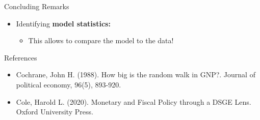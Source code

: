 \documentclass[10pt,c,aspectratio=1610,handout]{beamer}
\begin{document}
\begin{frame}{Concluding Remarks}
\begin{itemize}
\begin{itemize}
      \item[$\rightarrow$] Any AR(1) process can be transformed into a Markov process.%
      \item[$\rightarrow$] Any calculation of the AR(1) model is symmetric to the Markov model.%
    \end{itemize}%
    \pause%
    \item[$\blacktriangleright$] Identifying \textbf{model statistics:}%
    \begin{itemize}
      \item[$\rightarrow$] This allows to compare the model to the data!%
    \end{itemize}
  \end{itemize}%
\end{frame}%
\begin{frame}{References}%
  \begin{itemize}%
    \item[$\blacktriangleright$] Cochrane, John H. (1988). How big is the random walk in GNP?. Journal of political economy, 96(5), 893-920.%
    \item[$\blacktriangleright$] Cole, Harold L. (2020). Monetary and Fiscal Policy through a DSGE Lens. Oxford University Press.%
  \end{itemize}%
\end{frame}%
\end{document}
